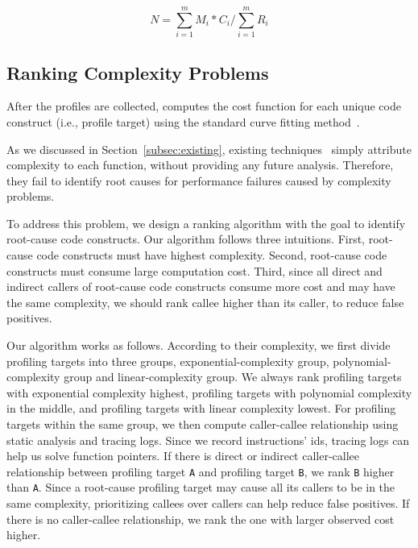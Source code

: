 {{%
\begin{equation} \label{eq:mark}
N = \sum\limits_{i=1}^m M_i*C_i\Big/\sum\limits_{i=1}^m R_i
\end{equation}

\subsection{Ranking Complexity Problems}

After the profiles are collected, \Tool computes
the cost function for each unique code construct
(i.e., profile target) using the standard curve fitting 
method~\cite{curve-fitting,curve-bounding}. 

 
As we discussed in Section~\ref{subsec:existing}, 
existing techniques~\cite{Aprof1,Aprof2,AlgoProf} 
simply attribute complexity to each function, 
without providing any future analysis. 
Therefore, they fail to identify root causes for 
performance failures caused by complexity problems. 

To address this problem, we design a ranking algorithm 
with the goal to identify root-cause code constructs.
Our algorithm follows three intuitions. 
First, root-cause code constructs must have highest complexity.
Second, root-cause code constructs must consume large computation cost.
Third, since all direct and indirect callers of root-cause code constructs 
consume more cost and may have the same complexity, 
we should rank callee higher than its caller, 
to reduce false positives. 


Our algorithm works as follows. 
According to their complexity, 
we first divide profiling targets into three groups, 
exponential-complexity group, 
polynomial-complexity group and linear-complexity group.
We always rank profiling targets with exponential complexity highest,
profiling targets with polynomial complexity in the middle,
and profiling targets with linear complexity lowest. 
For profiling targets within the same group, 
we then compute caller-callee relationship using static analysis and tracing logs.
Since we record instructions' ids, tracing logs can help us solve function pointers. 
If there is direct or indirect caller-callee relationship 
between profiling target \texttt{A}
and profiling target \texttt{B}, we rank \texttt{B} higher than \texttt{A}.
Since a root-cause profiling target may 
cause all its callers to be in the same complexity, 
prioritizing callees over callers can help reduce false positives.
If there is no caller-callee relationship,
we rank the one with larger observed cost higher.


}}
